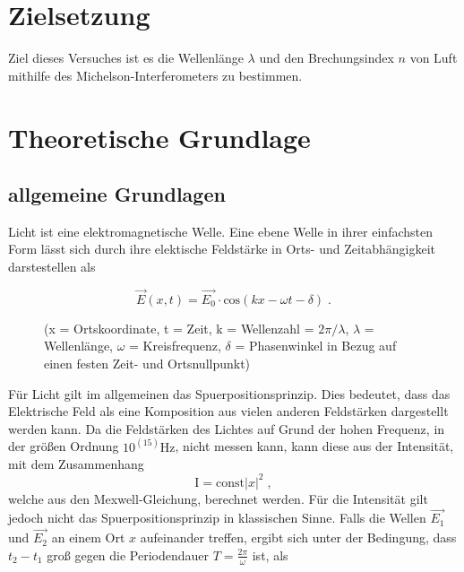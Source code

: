 \section{Zielsetzung}
    Ziel dieses Versuches ist es die Wellenlänge $\lambda$ und den Brechungsindex $n$ von Luft mithilfe des Michelson-Interferometers zu bestimmen.

\section{Theoretische Grundlage}
\noindent
\subsection{allgemeine Grundlagen}
Licht ist eine elektromagnetische Welle. Eine ebene Welle in ihrer einfachsten Form lässt sich durch ihre elektische Feldstärke in Orts- und Zeitabhängigkeit darstestellen als
\begin{figure}
    \[   \vec{E}(x, t) = \vec{E_0} \cdot \text{cos}(kx - \omega t - \delta) \;. \]
    \label{eqn:ansatz}
    \caption{(x = Ortskoordinate, t = Zeit, k = Wellenzahl = $2 \pi/\lambda$, $\lambda$ = Wellenlänge, $\omega$ = Kreisfrequenz, $\delta$ = Phasenwinkel in Bezug auf einen festen Zeit- und Ortsnullpunkt)}
\end{figure}
\noindent
Für Licht gilt im allgemeinen das Spuerpositionsprinzip. Dies bedeutet, dass das Elektrische Feld als eine Komposition aus vielen anderen Feldstärken dargestellt werden kann.
Da die Feldstärken des Lichtes auf Grund der hohen Frequenz, in der größen Ordnung $10^(15) \si{\hertz}$, nicht messen kann, kann diese aus der Intensität, mit dem Zusammenhang
\begin{equation*}
    \text{I} = \text{const} |x|^2 \; ,
    \label{eqn:Int}
\end{equation*}
\noindent
welche aus den Mexwell-Gleichung, berechnet werden. Für die Intensität gilt jedoch nicht das Spuerpositionsprinzip in klassischen Sinne. Falls die Wellen $\vec{E_1}$ und $\vec{E_2}$ 
an einem Ort $x$  aufeinander treffen, ergibt sich unter der Bedingung, dass $t_2 - t_1$ groß gegen die Periodendauer $T = \frac{2 \pi}{\omega}$ ist, als

